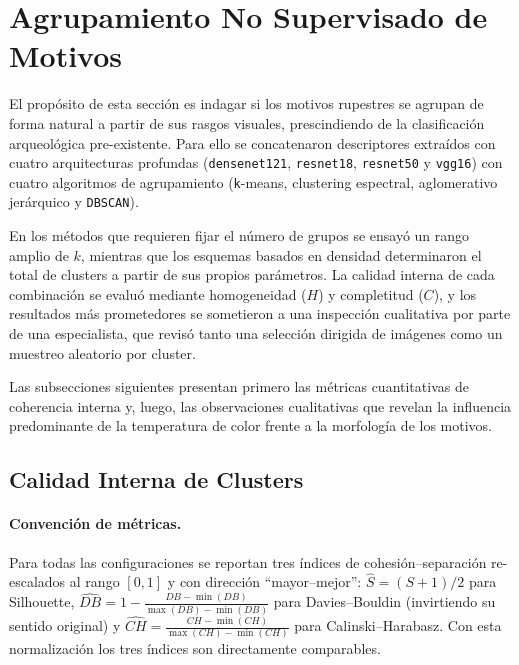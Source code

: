 \section{Agrupamiento No Supervisado de Motivos}

El propósito de esta sección es indagar si los motivos rupestres se agrupan de forma natural a partir de sus rasgos visuales, prescindiendo de la clasificación arqueológica pre-existente.
Para ello se concatenaron descriptores extraídos con cuatro arquitecturas profundas (\texttt{densenet121}, \texttt{resnet18}, \texttt{resnet50} y \texttt{vgg16}) con cuatro algoritmos de agrupamiento (\texttt{k}-means, clustering espectral, aglomerativo jerárquico y \texttt{DBSCAN}).

En los métodos que requieren fijar el número de grupos se ensayó un rango amplio de $k$, mientras que los esquemas basados en densidad determinaron el total de clusters a partir de sus propios parámetros.
La calidad interna de cada combinación se evaluó mediante homogeneidad ($H$) y completitud ($C$), y los resultados más prometedores se sometieron a una inspección cualitativa por parte de una especialista, que revisó tanto una selección dirigida de imágenes como un muestreo aleatorio por cluster.

Las subsecciones siguientes presentan primero las métricas cuantitativas de coherencia interna y, luego, las observaciones cualitativas que revelan la influencia predominante de la temperatura de color frente a la morfología de los motivos.

\subsection{Calidad Interna de Clusters}

\paragraph{Convención de métricas.}
Para todas las configuraciones se reportan tres índices de cohesión–separación
re-escalados al rango \([0,1]\) y con dirección “mayor–mejor”:
\(\widehat S=(S+1)/2\) para Silhouette,
\(\widehat{DB}=1-\frac{DB-\min(DB)}{\max(DB)-\min(DB)}\) para Davies–Bouldin
(invirtiendo su sentido original) y
\(\widehat{CH}=\frac{CH-\min(CH)}{\max(CH)-\min(CH)}\) para Calinski–Harabasz.
Con esta normalización los tres índices son directamente comparables.

